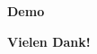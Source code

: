 \documentclass{beamer}
\begin{document}
\begin{frame}
  \centering
  \textbf{\textcolor{fg}{\Huge{Demo}}}
\end{frame}

\begin{frame}
  \centering
  \textbf{\textcolor{fg}{\Huge{Vielen Dank!}}}
\end{frame}
\end{document}
